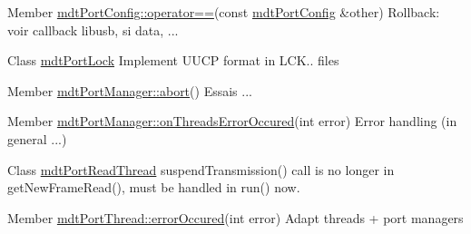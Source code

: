 \label{todo__todo000009}
\hypertarget{todo__todo000009}{}
 
\begin{DoxyDescription}
\item[Member \hyperlink{classmdt_port_config_a639c71f90cfeb7e2160ad90e9775054b}{mdtPortConfig::operator==}(const \hyperlink{classmdt_port_config}{mdtPortConfig} \&other) ]Rollback: voir callback libusb, si data, ... 
\end{DoxyDescription}

\label{todo__todo000003}
\hypertarget{todo__todo000003}{}
 
\begin{DoxyDescription}
\item[Class \hyperlink{classmdt_port_lock}{mdtPortLock} ]Implement UUCP format in LCK.. files 
\end{DoxyDescription}

\label{todo__todo000011}
\hypertarget{todo__todo000011}{}
 
\begin{DoxyDescription}
\item[Member \hyperlink{classmdt_port_manager_a1d185e9bb610aee16ccd9499ae7bff0d}{mdtPortManager::abort}() ]Essais ... 
\end{DoxyDescription}

\label{todo__todo000010}
\hypertarget{todo__todo000010}{}
 
\begin{DoxyDescription}
\item[Member \hyperlink{classmdt_port_manager_a7e45b8e3475e5182ed12218616664d07}{mdtPortManager::onThreadsErrorOccured}(int error) ]Error handling (in general ...) 
\end{DoxyDescription}

\label{todo__todo000012}
\hypertarget{todo__todo000012}{}
 
\begin{DoxyDescription}
\item[Class \hyperlink{classmdt_port_read_thread}{mdtPortReadThread} ]suspendTransmission() call is no longer in getNewFrameRead(), must be handled in run() now. 
\end{DoxyDescription}

\label{todo__todo000013}
\hypertarget{todo__todo000013}{}
 
\begin{DoxyDescription}
\item[Member \hyperlink{classmdt_port_thread_ab31cbe1a85aa830cd368654d1f806326}{mdtPortThread::errorOccured}(int error) ]Adapt threads + port managers
\end{DoxyDescription}

